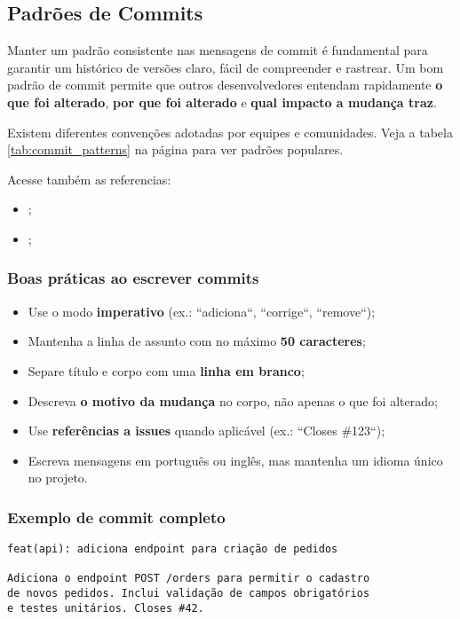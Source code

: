 \subsection{Padrões de Commits}

Manter um padrão consistente nas mensagens de commit é fundamental para garantir um histórico de versões claro, fácil de compreender e rastrear.  
Um bom padrão de commit permite que outros desenvolvedores entendam rapidamente \textbf{o que foi alterado}, \textbf{por que foi alterado} e \textbf{qual impacto a mudança traz}.

Existem diferentes convenções adotadas por equipes e comunidades. Veja a tabela \ref{tab:commit_patterns} na página \pageref{tab:commit_patterns} para ver padrões populares.

Acesse também as referencias:
\begin{itemize}
  \item {};
  \item {};
\end{itemize}

\subsubsection*{Boas práticas ao escrever commits}
\begin{itemize}
  \item Use o modo \textbf{imperativo} (ex.: ``adiciona``, ``corrige``, ``remove``);
  \item Mantenha a linha de assunto com no máximo \textbf{50 caracteres};
  \item Separe título e corpo com uma \textbf{linha em branco};
  \item Descreva \textbf{o motivo da mudança} no corpo, não apenas o que foi alterado;
  \item Use \textbf{referências a issues} quando aplicável (ex.: ``Closes \#123``);
  \item Escreva mensagens em português ou inglês, mas mantenha um idioma único no projeto.
\end{itemize}

\subsubsection*{Exemplo de commit completo}
\begin{verbatim}
feat(api): adiciona endpoint para criação de pedidos

Adiciona o endpoint POST /orders para permitir o cadastro
de novos pedidos. Inclui validação de campos obrigatórios
e testes unitários. Closes #42.
\end{verbatim}


